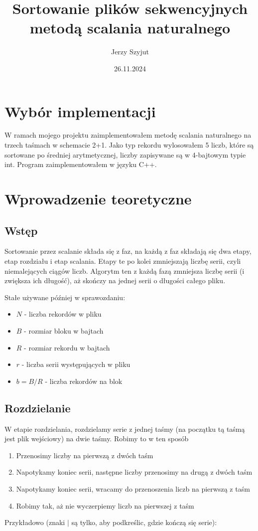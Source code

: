 \documentclass{article}
\title{Sortowanie plików sekwencyjnych metodą scalania naturalnego}
\author{Jerzy Szyjut}
\date{26.11.2024}
\begin{document}
\maketitle

\section{Wybór implementacji}
W ramach mojego projektu zaimplementowałem metodę scalania naturalnego na trzech taśmach w schemacie 2+1. Jako typ rekordu wylosowałem 5 liczb, które są sortowane po średniej arytmetycznej, liczby zapisywane są w 4-bajtowym typie int. Program zaimplementowałem w języku C++. 

\section{Wprowadzenie teoretyczne}
\subsection{Wstęp}
Sortowanie przez scalanie składa się z faz, na każdą z faz składają się dwa etapy, etap rozdziału i etap scalania. Etapy te po kolei zmniejszają liczbę serii, czyli niemalejących ciągów liczb. Algorytm ten z każdą fazą zmniejsza liczbę serii (i zwiększa ich długość), aż skończy na jednej serii o długości całego pliku. 

Stałe używane później w sprawozdaniu:
\begin{itemize}
\item $N$ - liczba rekordów w pliku
\item $B$ - rozmiar bloku w bajtach
\item $R$ - rozmiar rekordu w bajtach
\item $r$ - liczba serii występujących w pliku
\item $b = B/R$ - liczba rekordów na blok
\end{itemize}

\subsection{Rozdzielanie}
W etapie rozdzielania, rozdzielamy serie z jednej taśmy (na początku tą taśmą jest plik wejściowy) na dwie taśmy. Robimy to w ten sposób
\begin{enumerate}
    \item Przenosimy liczby na pierwszą z dwóch taśm
    \item Napotykamy koniec serii, następne liczby przenosimy na drugą z dwóch taśm
    \item Napotykamy koniec serii, wracamy do przenoszenia liczb na pierwszą z taśm
    \item Robimy tak, aż nie wyczerpiemy liczb na pierwszej z taśm
\end{enumerate}
Przykładowo (znaki $|$ są tylko, aby podkreślic, gdzie kończą się serie):
\end{document}
